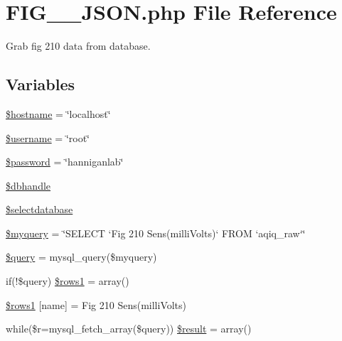 \hypertarget{_f_i_g__210___j_s_o_n_8php}{}\section{F\+I\+G\+\_\+\_\+\+J\+S\+O\+N.\+php File Reference}
\label{_f_i_g__210___j_s_o_n_8php}


Grab fig 210 data from database.  


\subsection*{Variables}
\begin{DoxyCompactItemize}
\item 
\hyperlink{_f_i_g__210___j_s_o_n_8php_a8bf9ffb42ed554b203b55377d1fc9aa4}{\$hostname} = \char`\"{}localhost\char`\"{}
\item 
\hyperlink{_f_i_g__210___j_s_o_n_8php_a0eb82aa5f81cf845de4b36cd653c42cf}{\$username} = \char`\"{}root\char`\"{}
\item 
\hyperlink{_f_i_g__210___j_s_o_n_8php_a607686ef9f99ea7c42f4f3dd3dbb2b0d}{\$password} = \char`\"{}hanniganlab\char`\"{}
\item 
\hyperlink{_f_i_g__210___j_s_o_n_8php_a013f690a9cf598d1498e72aa8aa8a8d2}{\$dbhandle}
\item 
\hyperlink{_f_i_g__210___j_s_o_n_8php_a3a00cb9dd022e8ab0cdfe17aad984a14}{\$selectdatabase}
\item 
\hyperlink{_f_i_g__210___j_s_o_n_8php_a8ff37acfddb2efb7962bb94d1c6d0d1c}{\$myquery} = \char`\"{}S\+E\+L\+E\+CT `Fig 210 Sens(milli\+Volts)` F\+R\+OM `aqiq\+\_\+raw`\char`\"{}
\item 
\hyperlink{_f_i_g__210___j_s_o_n_8php_af59a5f7cd609e592c41dc3643efd3c98}{\$query} = mysql\+\_\+query(\$myquery)
\item 
if(!\$query) \hyperlink{_f_i_g__210___j_s_o_n_8php_a15da33e0f4006a60bff01708cb5d1428}{\$rows1} = array()
\item 
\hyperlink{_f_i_g__210___j_s_o_n_8php_aece741d5099bb229e07df7a57776cfaa}{\$rows1} \mbox{[}\textquotesingle{}name\textquotesingle{}\mbox{]} = \textquotesingle{}Fig 210 Sens(milli\+Volts)\textquotesingle{}
\item 
while(\$r=mysql\+\_\+fetch\+\_\+array(\$query)) \hyperlink{_f_i_g__210___j_s_o_n_8php_a9148136d1e11f768be4f805d7e567da2}{\$result} = array()
\end{DoxyCompactItemize}


